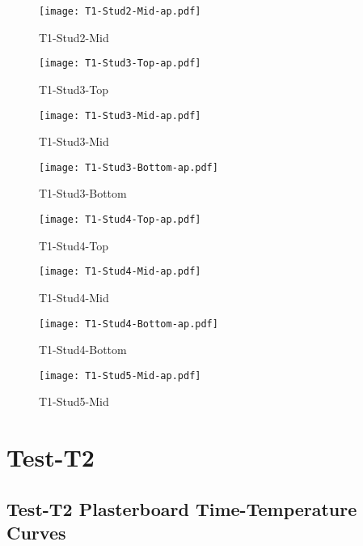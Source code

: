 \begin{figure}[htbp]
	\centering
			\texttt{[image: T1-Stud2-Mid-ap.pdf]}
			\caption*{T1-Stud2-Mid}
\end{figure}
\begin{figure}[htbp]
	\centering
			\texttt{[image: T1-Stud3-Top-ap.pdf]}
			\caption*{T1-Stud3-Top}
\end{figure}
\begin{figure}[htbp]
	\centering
			\texttt{[image: T1-Stud3-Mid-ap.pdf]}
			\caption*{T1-Stud3-Mid}
\end{figure}
\begin{figure}[htbp]
	\centering
			\texttt{[image: T1-Stud3-Bottom-ap.pdf]}
			\caption*{T1-Stud3-Bottom}
\end{figure}
\begin{figure}[htbp]
	\centering
			\texttt{[image: T1-Stud4-Top-ap.pdf]}
			\caption*{T1-Stud4-Top}
\end{figure}
\begin{figure}[htbp]
	\centering
			\texttt{[image: T1-Stud4-Mid-ap.pdf]}
			\caption*{T1-Stud4-Mid}
\end{figure}
\begin{figure}[htbp]
	\centering
			\texttt{[image: T1-Stud4-Bottom-ap.pdf]}
			\caption*{T1-Stud4-Bottom}
\end{figure}
\begin{figure}[htbp]
	\centering
			\texttt{[image: T1-Stud5-Mid-ap.pdf]}
			\caption*{T1-Stud5-Mid}
\end{figure}

\pagebreak

\section*{Test-T2}
\subsection*{Test-T2 Plasterboard Time-Temperature Curves}

